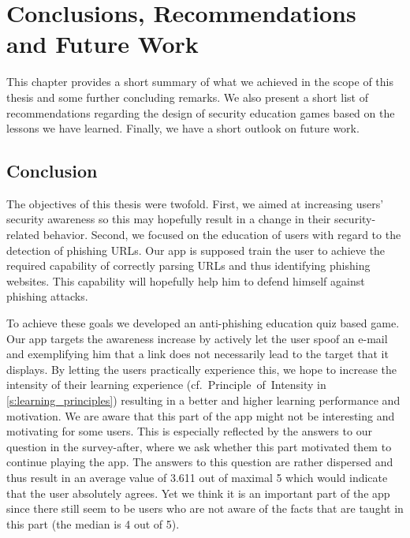 
\section{Conclusions, Recommendations and Future Work}
\label{s:conclusion}

This chapter provides a short summary of what we achieved in the scope of this thesis and some further concluding remarks.
We also present a short list of recommendations regarding the design of security education games based on the lessons we have learned.
Finally, we have a short outlook on future work.
\subsection{Conclusion}
The objectives of this thesis were twofold.
First, we aimed at increasing users' security awareness so this may hopefully result in a change in their security-related behavior.
Second, we focused on the education of users with regard to the detection of phishing URLs. 
Our app is supposed train the user to achieve the required capability of correctly parsing URLs and thus identifying phishing websites.
This capability will hopefully help him to defend himself against phishing attacks.

To achieve these goals we developed an anti-phishing education quiz based game.
Our app targets the awareness increase by actively let the user spoof an e-mail and exemplifying him that a link does not necessarily lead to the target that it displays.
By letting the users practically experience this, we hope to increase the intensity of their learning experience (cf.~Principle~of~Intensity in \autoref{s:learning_principles}) resulting in a better and higher learning performance and motivation. We are aware that this part of the app might not be interesting and motivating for some users.
This is especially reflected by the answers to our question in the survey-after, where we ask whether this part motivated them to continue playing the app. 
The answers to this question are rather dispersed and thus result in an average value of 3.611 out of maximal 5 which would indicate that the user absolutely agrees.
Yet we think it is an important part of the app since there still seem to be users who are not aware of the facts that are taught in this part (the median is 4 out of 5).

